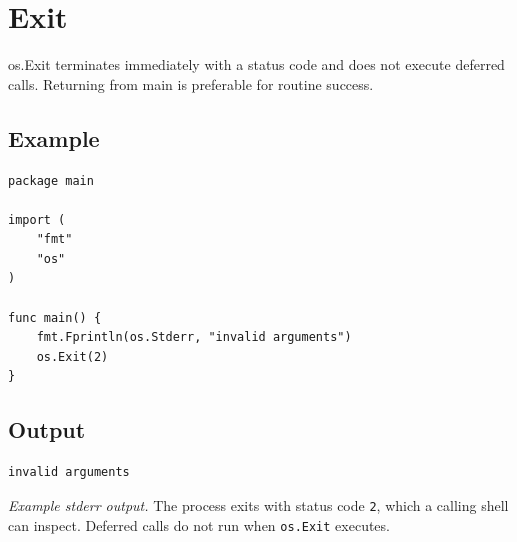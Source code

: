 \documentclass[10pt,oneside]{article}
\newcommand{\sectionline}{\par\vspace{4pt}{\color{rule}\hrule height .5pt}\vspace{7pt}\color{ink}\noindent}
\begin{document}
\section{Exit}
\sectionline
os.Exit terminates immediately with a status code and does not execute deferred calls. Returning from main is preferable for routine success.\par
\subsection*{Example}
\begin{lstlisting}[style=gocode]
package main

import (
	"fmt"
	"os"
)

func main() {
	fmt.Fprintln(os.Stderr, "invalid arguments")
	os.Exit(2)
}
\end{lstlisting}


\subsection*{Output}
\begin{lstlisting}[style=terminal]
invalid arguments
\end{lstlisting}
\emph{Example stderr output.} The process exits with status code \texttt{2}, which a calling shell can inspect. Deferred calls do not run when \texttt{os.Exit} executes.
\end{document}
